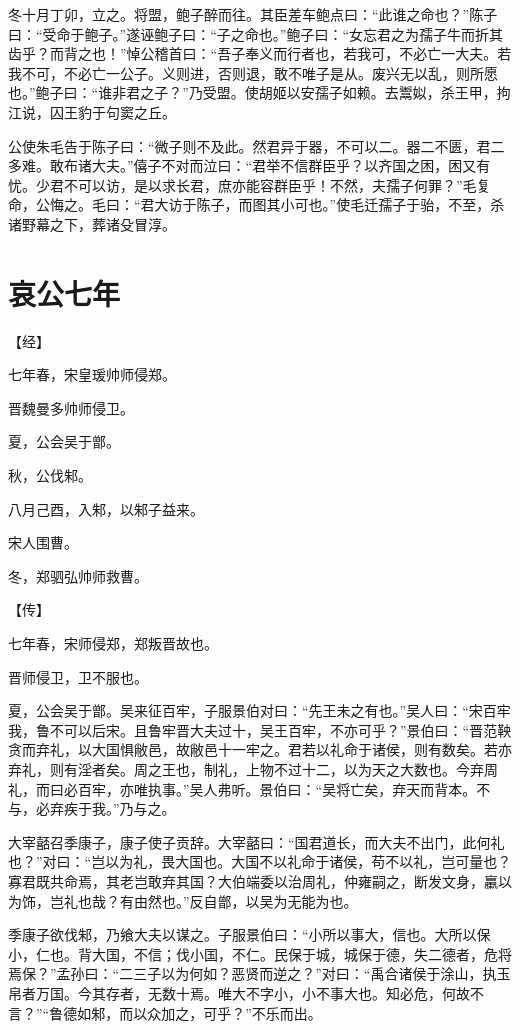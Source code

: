 \documentclass[a4paper,12pt,UTF8,twoside]{ctexbook}
\begin{document}
冬十月丁卯，立之。将盟，鲍子醉而往。其臣差车鲍点曰：“此谁之命也？”陈子曰：“受命于鲍子。”遂诬鲍子曰：“子之命也。”鲍子曰：“女忘君之为孺子牛而折其齿乎？而背之也！”悼公稽首曰：“吾子奉义而行者也，若我可，不必亡一大夫。若我不可，不必亡一公子。义则进，否则退，敢不唯子是从。废兴无以乱，则所愿也。”鲍子曰：“谁非君之子？”乃受盟。使胡姬以安孺子如赖。去鬻姒，杀王甲，拘江说，囚王豹于句窦之丘。

公使朱毛告于陈子曰：“微子则不及此。然君异于器，不可以二。器二不匮，君二多难。敢布诸大夫。”僖子不对而泣曰：“君举不信群臣乎？以齐国之困，困又有忧。少君不可以访，是以求长君，庶亦能容群臣乎！不然，夫孺子何罪？”毛复命，公悔之。毛曰：“君大访于陈子，而图其小可也。”使毛迁孺子于骀，不至，杀诸野幕之下，葬诸殳冒淳。


\chapter{哀公七年}



【经】

七年春，宋皇瑗帅师侵郑。

晋魏曼多帅师侵卫。

夏，公会吴于鄫。

秋，公伐邾。

八月己酉，入邾，以邾子益来。

宋人围曹。

冬，郑驷弘帅师救曹。

【传】

七年春，宋师侵郑，郑叛晋故也。

晋师侵卫，卫不服也。

夏，公会吴于鄫。吴来征百牢，子服景伯对曰：“先王未之有也。”吴人曰：“宋百牢我，鲁不可以后宋。且鲁牢晋大夫过十，吴王百牢，不亦可乎？”景伯曰：“晋范鞅贪而弃礼，以大国惧敝邑，故敝邑十一牢之。君若以礼命于诸侯，则有数矣。若亦弃礼，则有淫者矣。周之王也，制礼，上物不过十二，以为天之大数也。今弃周礼，而曰必百牢，亦唯执事。”吴人弗听。景伯曰：“吴将亡矣，弃天而背本。不与，必弃疾于我。”乃与之。

大宰嚭召季康子，康子使子贡辞。大宰嚭曰：“国君道长，而大夫不出门，此何礼也？”对曰：“岂以为礼，畏大国也。大国不以礼命于诸侯，苟不以礼，岂可量也？寡君既共命焉，其老岂敢弃其国？大伯端委以治周礼，仲雍嗣之，断发文身，臝以为饰，岂礼也哉？有由然也。”反自鄫，以吴为无能为也。

季康子欲伐邾，乃飨大夫以谋之。子服景伯曰：“小所以事大，信也。大所以保小，仁也。背大国，不信；伐小国，不仁。民保于城，城保于德，失二德者，危将焉保？”孟孙曰：“二三子以为何如？恶贤而逆之？”对曰：“禹合诸侯于涂山，执玉帛者万国。今其存者，无数十焉。唯大不字小，小不事大也。知必危，何故不言？”“鲁德如邾，而以众加之，可乎？”不乐而出。
\end{document}
